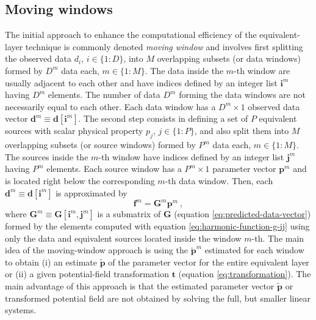 \subsection{Moving windows}

The initial approach to enhance the computational efficiency of the equivalent-layer technique 
is commonly denoted \textit{moving window} and involves
first splitting the observed data $d_{i}$, $i \in \{1 : D\}$, into $M$ overlapping subsets (or data windows) 
formed by $D^{m}$ data each, $m \in \{ 1 : M \}$.
The data inside the $m$-th window are usually adjacent to each other and have indices defined by an 
integer list $\mathbf{i}^{m}$ having $D^{m}$ elements.
The number of data $D^{m}$ forming the data windows are not necessarily equal to each other.
Each data window has a $D^{m} \times 1$ observed data vector $\mathbf{d}^{m} \equiv \mathbf{d}[\mathbf{i}^{m}]$.
The second step consists in defining a set of $P$ equivalent sources with scalar physical property $p_{j}$, $j \in \{1:P\}$,
and also split them into $M$ overlapping subsets (or source windows) formed by $P^{m}$ data each, $m \in \{ 1 : M \}$.
The sources inside the $m$-th window have indices defined by an integer list $\mathbf{j}^{m}$ having $P^{m}$ elements.
Each source window has a $P^{m} \times 1$ parameter vector $\mathbf{p}^{m}$ and
is located right below the corresponding $m$-th data window. 
Then, each $\mathbf{d}^{m} \equiv \mathbf{d}[\mathbf{i}^{m}]$ is approximated by 
\begin{equation}
	\mathbf{f}^{m} = \mathbf{G}^{m} \mathbf{p}^{m} \: ,
	\label{eq:predicted-data-window-m}
\end{equation}
where $\mathbf{G}^{m} \equiv \mathbf{G}[\mathbf{i}^{m}, \mathbf{j}^{m}]$ is a submatrix of 
$\mathbf{G}$ (equation \ref{eq:predicted-data-vector}) formed by the elements computed with equation 
\ref{eq:harmonic-function-g-ij} using only the data and equivalent sources located inside the window $m$-th.
The main idea of the moving-window approach is using the $\tilde{\mathbf{p}}^{m}$ estimated for 
each window to obtain (i) an estimate $\tilde{\mathbf{p}}$ of the parameter vector for the entire equivalent layer
or (ii) a given potential-field transformation $\mathbf{t}$ (equation \ref{eq:transformation}).
The main advantage of this approach is that the estimated parameter vector $\tilde{\mathbf{p}}$ or transformed potential field
are not obtained by solving the full, but smaller linear systems.

